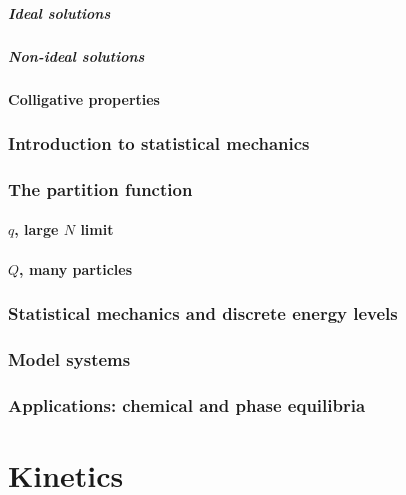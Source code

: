 \documentclass{article}
\numberwithin{theorem}{section}
\numberwithin{corollary}{section}
\numberwithin{postulate}{section}
\numberwithin{lemma}{section}
\numberwithin{definition}{section}
\begin{document}
\subsubsection{Ideal solutions}

\subsubsection{Non-ideal solutions}

\subsection{Colligative properties}

\section{Introduction to statistical mechanics}

\section{The partition function}

\subsection{$q$, large $N$ limit}

\subsection{$Q$, many particles}

\section{Statistical mechanics and discrete energy levels}

\section{Model systems}

\section{Applications: chemical and phase equilibria}

\part{Kinetics}
\end{document}
